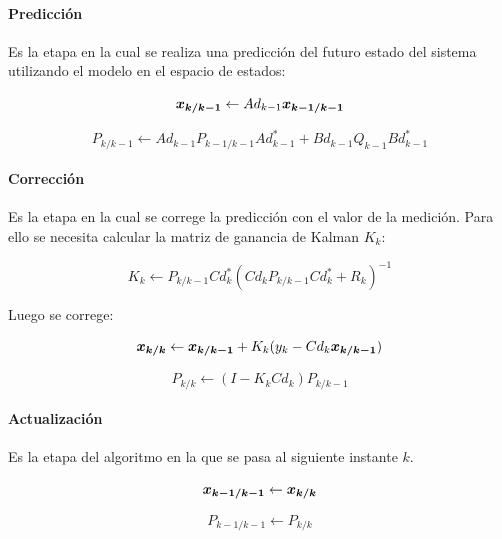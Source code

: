 			\paragraph{Predicción}
				Es la etapa en la cual se realiza una predicción del futuro estado del sistema utilizando el modelo en el espacio de estados:
				
				\begin{equation*}
					\boldsymbol{x_{k/k - 1}} \leftarrow Ad_{k - 1} \boldsymbol{x_{k - 1/k - 1}}
				\end{equation*}
				
				\begin{equation*}
					P_{k/k - 1} \leftarrow Ad_{k - 1} P_{k - 1 / k - 1} Ad_{k - 1}^{*} + Bd_{k - 1} Q_{k - 1} Bd_{k - 1}^{*}
				\end{equation*}
			\paragraph{Corrección}
				Es la etapa en la cual se correge la predicción con el valor de la medición. Para ello se necesita calcular la matriz de ganancia de Kalman $K_{k}$:
				
				\begin{equation*}
					K_{k} \leftarrow P_{k / k - 1} Cd_{k}^{*} (Cd_{k} P_{k/k - 1} Cd_{k}^{*} + R_{k})^{-1}
				\end{equation*}
				
				Luego se correge:
				
				\begin{equation*}
					\boldsymbol{x_{k/k}} \leftarrow \boldsymbol{x_{k/k - 1}} + K_{k} (y_{k} - Cd_{k} \boldsymbol{x_{k/k - 1}})
				\end{equation*}
				
				\begin{equation*}
					P_{k/k} \leftarrow (I - K_{k} Cd_{k}) P_{k/k - 1}
				\end{equation*}
					
			\paragraph{Actualización}
				Es la etapa del algoritmo en la que se pasa al siguiente instante $k$.
				
				\begin{equation*}
					\boldsymbol{x_{k - 1/k - 1}} \leftarrow \boldsymbol{x_{k/k}}
				\end{equation*}
				
				\begin{equation*}
					P_{k - 1/k - 1} \leftarrow P_{k/k}
				\end{equation*}


